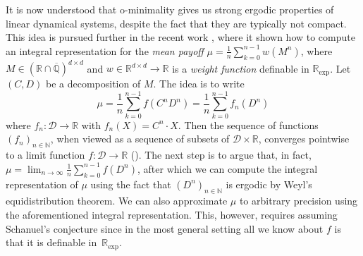 \documentclass[a4paper,UKenglish,cleveref]{lipics-v2021}
\newcommand{\nat}{\mathbb{N}}
\newcommand{\rel}{\mathbb{R}}
\newcommand{\rat}{\mathbb{Q}}
\newcommand{\alg}{\overline{\rat}}
\newcommand{\ralg}{\rel \cap \alg}
\newcommand{\rexp}{\rel_{\exp}}
\newcommand{\Dcal}{\mathcal{D}}
\begin{document}
It is now understood that o-minimality gives us strong ergodic properties of linear dynamical systems, despite the fact that they are typically not compact.
This idea is pursued further in the recent work \cite{nahs}, where it shown how to compute an integral representation for the \emph{mean payoff} $\mu = \frac 1 n \sum_{k=0}^{n-1} w(M^n)$, where $M \in (\ralg)^{d\times d}$ and $w \in \rel^{d\times d} \to \rel$ is a \emph{weight function} definable in $\rexp$.
Let $(C,D)$ be a decomposition of $M$.
The idea is to write
\[
\mu = \frac 1 n \sum_{k=0}^{n-1} f(C^nD^n) = \frac 1 n \sum_{k=0}^{n-1} f_n(D^n)
\]
where $f_n \colon \Dcal \to \rel$ with $f_n (X) = C^n \cdot X$.
Then the sequence of functions $(f_n)_{n\in\nat}$, when viewed as a sequence of subsets of $\Dcal \times \rel$, converges pointwise to a limit function $f \colon \Dcal \to \rel$ ().
The next step is to argue that, in fact, $\mu = \lim_{n\to \infty} \frac 1 n \sum_{k=0}^{n-1} f(D^n)$, after which we can compute the integral representation of $\mu$ using the fact that $(D^n)_{n\in\nat}$ is ergodic by Weyl's equidistribution theorem.
We can also approximate $\mu$ to arbitrary precision using the aforementioned integral representation.
This, however, requires assuming Schanuel's conjecture since in the most general setting all we know about $f$ is that it is definable in~$\rexp$.






\end{document}
